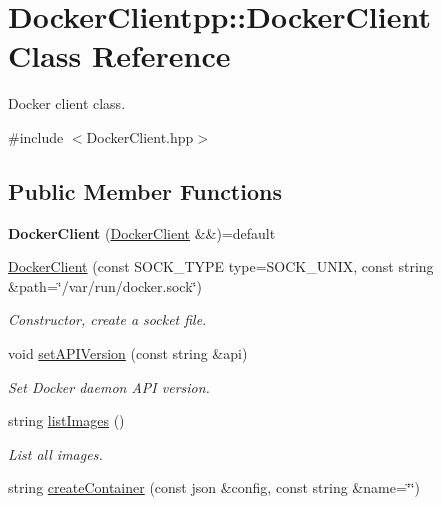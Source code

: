 \hypertarget{classDockerClientpp_1_1DockerClient}{}\section{Docker\+Clientpp\+::Docker\+Client Class Reference}
\label{classDockerClientpp_1_1DockerClient}


Docker client class.  




{\ttfamily \#include $<$Docker\+Client.\+hpp$>$}

\subsection*{Public Member Functions}
\begin{DoxyCompactItemize}
\item 
\mbox{\label{classDockerClientpp_1_1DockerClient_ae66b869be0b356d07bed099fb5d311ac}} 
{\bfseries Docker\+Client} (\mbox{\hyperlink{classDockerClientpp_1_1DockerClient}{Docker\+Client}} \&\&)=default
\item 
\mbox{\hyperlink{classDockerClientpp_1_1DockerClient_ad31ac3b1fb47c88e257166ad3a51bd95}{Docker\+Client}} (const S\+O\+C\+K\+\_\+\+T\+Y\+PE type=S\+O\+C\+K\+\_\+\+U\+N\+IX, const string \&path=\char`\"{}/var/run/docker.\+sock\char`\"{})
\begin{DoxyCompactList}\small\item\em Constructor, create a socket file. \end{DoxyCompactList}\item 
void \mbox{\hyperlink{classDockerClientpp_1_1DockerClient_af02eb7797cedbac948893bd29a2470c7}{set\+A\+P\+I\+Version}} (const string \&api)
\begin{DoxyCompactList}\small\item\em Set Docker daemon A\+PI version. \end{DoxyCompactList}\item 
string \mbox{\hyperlink{classDockerClientpp_1_1DockerClient_a75a5e6d2cde8f461af8f60a41261df09}{list\+Images}} ()
\begin{DoxyCompactList}\small\item\em List all images. \end{DoxyCompactList}\item 
string \mbox{\hyperlink{classDockerClientpp_1_1DockerClient_a0bef0244ed9468797267bef38252cc62}{create\+Container}} (const json \&config, const string \&name=\char`\"{}\char`\"{})

\end{DoxyCompactItemize}
